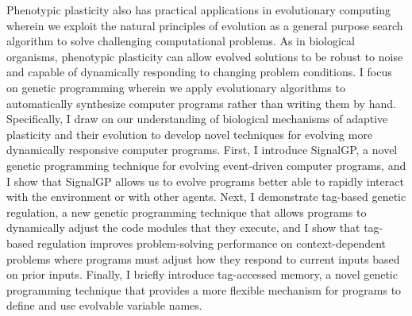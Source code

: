 Phenotypic plasticity also has practical applications in evolutionary computing wherein we exploit the natural principles of evolution as a general purpose search algorithm to solve challenging computational problems. 
As in biological organisms, phenotypic plasticity can allow evolved solutions to be robust to noise and capable of dynamically responding to changing problem conditions.
I focus on genetic programming wherein we apply evolutionary algorithms to automatically synthesize computer programs rather than writing them by hand.
Specifically, I draw on our understanding of biological mechanisms of adaptive plasticity and their evolution to develop novel techniques for evolving more dynamically responsive computer programs.
First, I introduce SignalGP, a novel genetic programming technique for evolving event-driven computer programs, and I show that SignalGP allows us to evolve programs better able to rapidly interact with the environment or with other agents. 
Next, I demonstrate tag-based genetic regulation, a new genetic programming technique that allows programs to dynamically adjust the code modules that they execute, and I show that tag-based regulation improves problem-solving performance on context-dependent problems where programs must adjust how they respond to current inputs based on prior inputs.
Finally, I briefly introduce tag-accessed memory, a novel genetic programming technique that provides a more flexible mechanism for programs to define and use evolvable variable names.